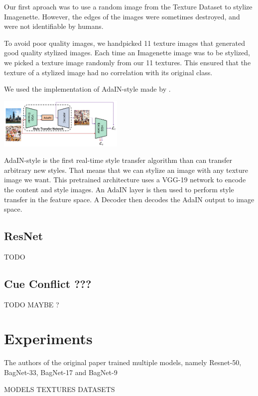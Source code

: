 \documentclass{article}
\begin{document}
\noindent
Our first aproach was to use a random image from the Texture Dataset to stylize Imagenette. However, 
the edges of the images were sometimes destroyed, and were not identifiable by humans. \smallskip

\noindent
To avoid poor quality images, we handpicked 11 texture images that generated good quality stylized images.
Each time an Imagenette image was to be stylized, we picked a texture image randomly from our 11 textures.
This ensured that the texture of a stylized image had no correlation with its original class. \smallskip

\noindent
We used the implementation of AdaIN-style \cite{huang2017arbitrary} made by \cite{stylizeddatasets2019}.

\includegraphics[width=0.45\textwidth]{imgs/adain_architecture}

AdaIN-style is the first real-time style transfer algorithm than can transfer arbitrary new styles.
That means that we can stylize an image with any texture image we want.
This pretrained architecture uses a VGG-19 network to encode the content and style images.
An AdaIN layer is then used to perform style transfer in the feature space.   
A Decoder then decodes the AdaIN output to image space.

\subsection{ResNet}

TODO


\subsection{Cue Conflict ???}

TODO MAYBE ?

\newpage
\section{Experiments}

The authors of the original paper trained multiple models, 
namely Resnet-50, BagNet-33, BagNet-17 and BagNet-9

MODELS
TEXTURES
DATASETS
\end{document}

